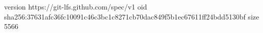 version https://git-lfs.github.com/spec/v1
oid sha256:37631afc36fc10091c46c3bc1c8271cb70dac849f5b1ec67611ff24bdd5130bf
size 5566
